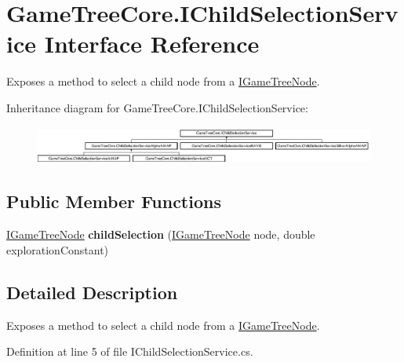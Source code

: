 \hypertarget{interface_game_tree_core_1_1_i_child_selection_service}{}\section{Game\+Tree\+Core.\+I\+Child\+Selection\+Service Interface Reference}
\label{interface_game_tree_core_1_1_i_child_selection_service}


Exposes a method to select a child node from a \mbox{\hyperlink{interface_game_tree_core_1_1_i_game_tree_node}{I\+Game\+Tree\+Node}}.  


Inheritance diagram for Game\+Tree\+Core.\+I\+Child\+Selection\+Service\+:\begin{figure}[H]
\begin{center}
\leavevmode
\includegraphics[height=1.242604cm]{interface_game_tree_core_1_1_i_child_selection_service}
\end{center}
\end{figure}
\subsection*{Public Member Functions}
\begin{DoxyCompactItemize}
\item 
\mbox{\label{interface_game_tree_core_1_1_i_child_selection_service_a48cd3434b6f327de07b8522fae6d92ff}} 
\mbox{\hyperlink{interface_game_tree_core_1_1_i_game_tree_node}{I\+Game\+Tree\+Node}} {\bfseries child\+Selection} (\mbox{\hyperlink{interface_game_tree_core_1_1_i_game_tree_node}{I\+Game\+Tree\+Node}} node, double exploration\+Constant)
\end{DoxyCompactItemize}


\subsection{Detailed Description}
Exposes a method to select a child node from a \mbox{\hyperlink{interface_game_tree_core_1_1_i_game_tree_node}{I\+Game\+Tree\+Node}}. 



Definition at line 5 of file I\+Child\+Selection\+Service.\+cs.


